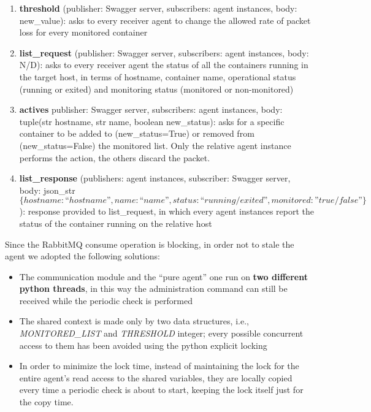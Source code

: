 \begin{enumerate}
	\item \textbf{threshold} (publisher: Swagger server, subscribers: agent instances, body: new\_value): asks to every receiver agent to change the allowed rate of packet loss for every monitored container
	\item \textbf{list\_request} (publisher: Swagger server, subscribers: agent instances, body: N/D): asks to every receiver agent the status of all the containers running in the target host, in terms of hostname, container name, operational status (running or exited) and monitoring status (monitored or non-monitored)
	\item \textbf{actives} publisher: Swagger server, subscribers: agent instances, body: tuple(str hostname, str name, boolean new\_status): asks for a specific container to be added to (new\_status=True) or removed from (new\_status=False) the monitored list. Only the relative agent instance performs the action, the others discard the packet.
	\item \textbf{list\_response} (publishers: agent instances, subscriber: Swagger server, body: json\_str \textit{\[\{hostname: “hostname”, name: “name”, status: “running/exited”, monitored: ”true/false”\}\]}): response provided to list\_request, in which every agent instances report the status of the container running on the relative host
\end{enumerate}

\noindent Since the RabbitMQ consume operation is blocking, in order not to stale the agent we adopted the following solutions:
\begin{itemize}
	\item The communication module and the “pure agent” one run on \textbf{two different python threads}, in this way the administration command can still be received while the periodic check is performed
	\item The shared context is made only by two data structures, i.e.,  \textit{MONITORED\_LIST} and \textit{THRESHOLD} integer; every possible concurrent access to them has been avoided using the python explicit locking
	\item In order to minimize the lock time, instead of maintaining the lock for the entire agent’s read access to the shared variables, they are locally copied every time a periodic check is about to start, keeping the lock itself just for the copy time.
\end{itemize}

